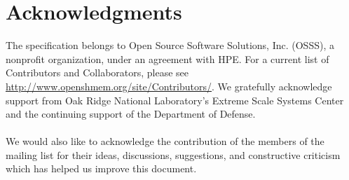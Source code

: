 \date{\today}

\section*{Acknowledgments}
The \openshmem specification belongs to Open Source Software Solutions, Inc.
(OSSS), a nonprofit organization, under an agreement with HPE. For a current list
of Contributors and Collaborators, please see
  \url{http://www.openshmem.org/site/Contributors/}.
We gratefully acknowledge support from
Oak Ridge National Laboratory's
Extreme Scale Systems Center and the continuing support of the Department of Defense.\\
\\
We would also like to acknowledge the contribution of the members of the
\openshmem mailing list for their ideas, discussions, suggestions, and
constructive criticism which has helped us improve this document.\\

